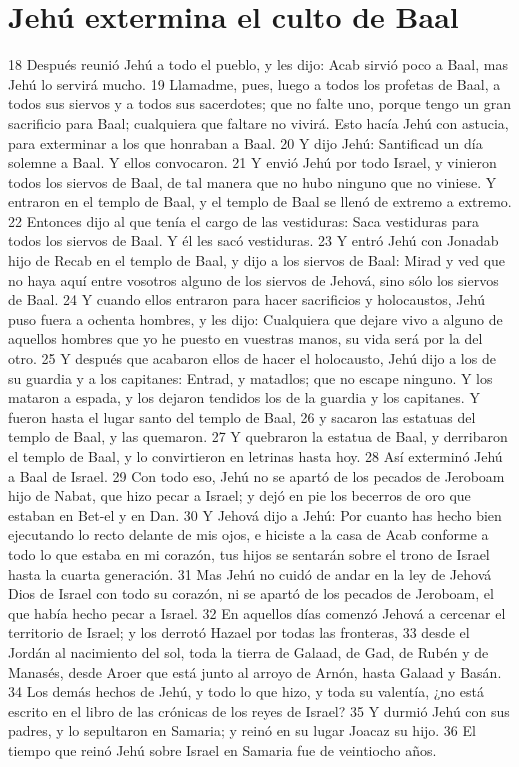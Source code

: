 \section*{Jehú extermina el culto de Baal}

18 Después reunió Jehú a todo el pueblo, y les dijo: Acab sirvió poco a Baal, mas Jehú lo servirá mucho.
19 Llamadme, pues, luego a todos los profetas de Baal, a todos sus siervos y a todos sus sacerdotes; que no falte uno, porque tengo un gran sacrificio para Baal; cualquiera que faltare no vivirá. Esto hacía Jehú con astucia, para exterminar a los que honraban a Baal.
20 Y dijo Jehú: Santificad un día solemne a Baal. Y ellos convocaron.
21 Y envió Jehú por todo Israel, y vinieron todos los siervos de Baal, de tal manera que no hubo ninguno que no viniese. Y entraron en el templo de Baal, y el templo de Baal se llenó de extremo a extremo.
22 Entonces dijo al que tenía el cargo de las vestiduras: Saca vestiduras para todos los siervos de Baal. Y él les sacó vestiduras.
23 Y entró Jehú con Jonadab hijo de Recab en el templo de Baal, y dijo a los siervos de Baal: Mirad y ved que no haya aquí entre vosotros alguno de los siervos de Jehová, sino sólo los siervos de Baal.
24 Y cuando ellos entraron para hacer sacrificios y holocaustos, Jehú puso fuera a ochenta hombres, y les dijo: Cualquiera que dejare vivo a alguno de aquellos hombres que yo he puesto en vuestras manos, su vida será por la del otro.
25 Y después que acabaron ellos de hacer el holocausto, Jehú dijo a los de su guardia y a los capitanes: Entrad, y matadlos; que no escape ninguno. Y los mataron a espada, y los dejaron tendidos los de la guardia y los capitanes. Y fueron hasta el lugar santo del templo de Baal,
26 y sacaron las estatuas del templo de Baal, y las quemaron.
27 Y quebraron la estatua de Baal, y derribaron el templo de Baal, y lo convirtieron en letrinas hasta hoy.
28 Así exterminó Jehú a Baal de Israel.
29 Con todo eso, Jehú no se apartó de los pecados de Jeroboam hijo de Nabat, que hizo pecar a Israel; y dejó en pie los becerros de oro que estaban en Bet-el y en Dan. 
30 Y Jehová dijo a Jehú: Por cuanto has hecho bien ejecutando lo recto delante de mis ojos, e hiciste a la casa de Acab conforme a todo lo que estaba en mi corazón, tus hijos se sentarán sobre el trono de Israel hasta la cuarta generación.
31 Mas Jehú no cuidó de andar en la ley de Jehová Dios de Israel con todo su corazón, ni se apartó de los pecados de Jeroboam, el que había hecho pecar a Israel.
32 En aquellos días comenzó Jehová a cercenar el territorio de Israel; y los derrotó Hazael por todas las fronteras,
33 desde el Jordán al nacimiento del sol, toda la tierra de Galaad, de Gad, de Rubén y de Manasés, desde Aroer que está junto al arroyo de Arnón, hasta Galaad y Basán.
34 Los demás hechos de Jehú, y todo lo que hizo, y toda su valentía, ¿no está escrito en el libro de las crónicas de los reyes de Israel?
35 Y durmió Jehú con sus padres, y lo sepultaron en Samaria; y reinó en su lugar Joacaz su hijo.
36 El tiempo que reinó Jehú sobre Israel en Samaria fue de veintiocho años.

